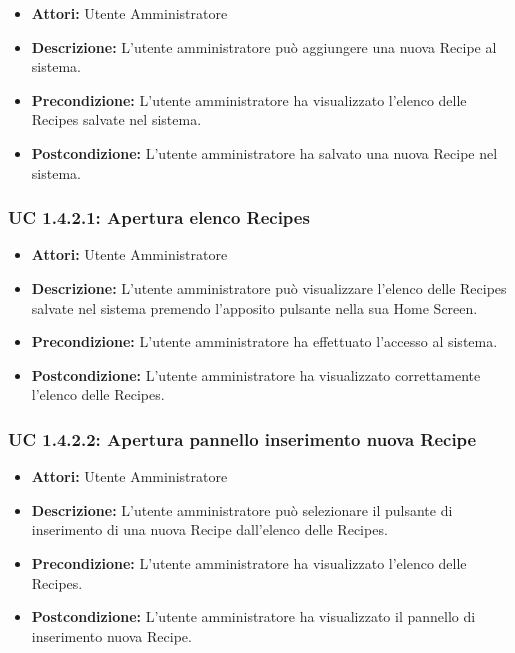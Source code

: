 \begin{itemize}
\item \textbf{Attori:} Utente Amministratore
\item \textbf{Descrizione:} L'utente amministratore può aggiungere una nuova Recipe al sistema.
\item \textbf{Precondizione:} L'utente amministratore ha visualizzato l'elenco delle Recipes salvate nel sistema.
\item \textbf{Postcondizione:} L'utente amministratore ha salvato una nuova Recipe nel sistema.
\end{itemize}

\subsubsection{UC 1.4.2.1: Apertura elenco Recipes}

\begin{itemize}
\item \textbf{Attori:} Utente Amministratore
\item \textbf{Descrizione:} L'utente amministratore può visualizzare l'elenco delle Recipes salvate nel sistema premendo l'apposito pulsante nella sua Home Screen.
\item \textbf{Precondizione:} L'utente amministratore ha effettuato l'accesso al sistema.
\item \textbf{Postcondizione:} L'utente amministratore ha visualizzato correttamente l'elenco delle Recipes.
\end{itemize}

\subsubsection{UC 1.4.2.2: Apertura pannello inserimento nuova Recipe}

\begin{itemize}
\item \textbf{Attori:} Utente Amministratore
\item \textbf{Descrizione:} L'utente amministratore può selezionare il pulsante di inserimento di una nuova Recipe dall'elenco delle Recipes.
\item \textbf{Precondizione:} L'utente amministratore ha visualizzato l'elenco delle Recipes.
\item \textbf{Postcondizione:} L'utente amministratore ha visualizzato il pannello di inserimento nuova Recipe.
\end{itemize}


